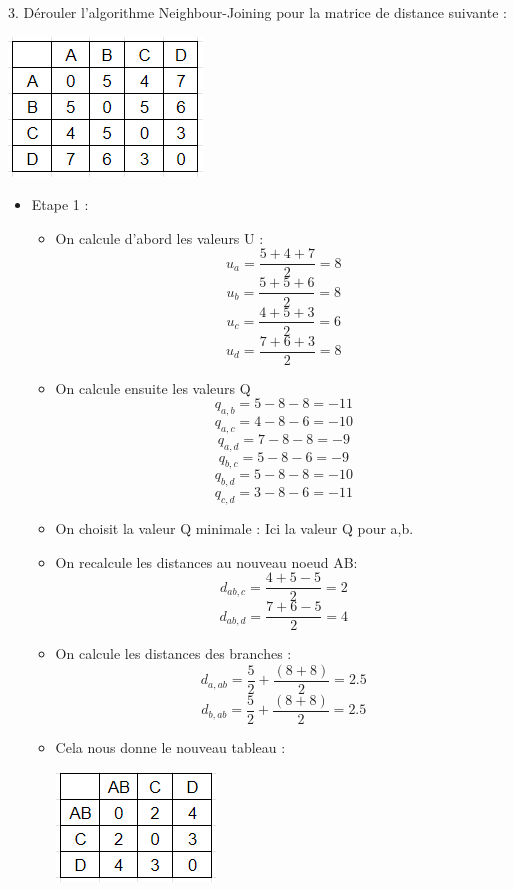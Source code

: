 \documentclass[
	12pt, %
]{fphw}
\begin{document}
\begin{problem}
	3. Dérouler l'algorithme Neighbour-Joining pour la matrice de distance suivante :
\begin{center}
	\includegraphics[width=0.5\columnwidth]{mat1.png}
\end{center}
\end{problem}
\begin{center}
\begin{itemize}
		\item Etape 1 :
			\begin{itemize}
			\item On calcule d'abord les valeurs U :
				\[ u_{a} = \frac{5+4+7}{2} = 8 \]
				\[ u_{b} = \frac{5+5+6}{2} = 8 \]
				\[ u_{c} = \frac{4+5+3}{2} = 6 \]
				\[ u_{d} = \frac{7+6+3}{2} = 8 \]
			\item On calcule ensuite les valeurs Q
				\[ q_{a,b} = 5-8-8 = -11 \]
				\[ q_{a,c} = 4-8-6 = -10 \]
				\[ q_{a,d} = 7-8-8 = -9 \]
				\[ q_{b,c} = 5-8-6 = -9 \]
				\[ q_{b,d} = 5-8-8 = -10 \]
				\[ q_{c,d} = 3-8-6 = -11 \]
			\item On choisit la valeur Q minimale : Ici la valeur Q pour a,b.
			\item On recalcule les distances au nouveau noeud AB:
				\[ d_{ab,c} = \frac{4+5-5}{2} = 2 \]
				\[ d_{ab,d} = \frac{7+6-5}{2} = 4 \]	
			\item On calcule les distances des branches :
				\[ d_{a,ab} = \frac{5}{2} + \frac{(8+8)}{2} = 2.5 \]
				\[ d_{b,ab} = \frac{5}{2} + \frac{(8+8)}{2} = 2.5 \]
			\item Cela nous donne le nouveau tableau :
				\begin{center}
					\includegraphics[width=0.5\columnwidth]{mat2.png} 

\end{center}
\end{itemize}
\end{itemize}
\end{center}
\end{document}
